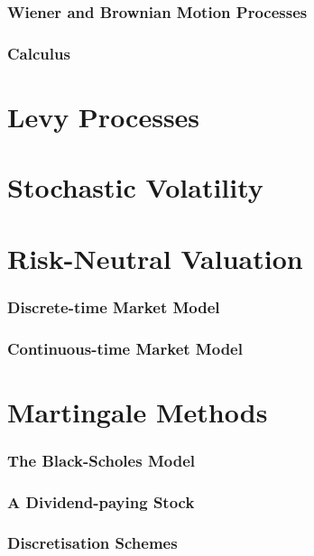 \documentclass[12pt, a4paper]{article}
\begin{document}
\section{Wiener and Brownian Motion Processes}


\section{\Ito{} Calculus}
%

\part{Levy Processes}
%


\part{Stochastic Volatility}
%

\part{Risk-Neutral Valuation}

\section{Discrete-time Market Model}
%

\section{Continuous-time Market Model}
%

\part{Martingale Methods}
\section{The Black-Scholes Model}
%

\section{A Dividend-paying Stock}
%

\section{Discretisation Schemes}
%
\end{document}
